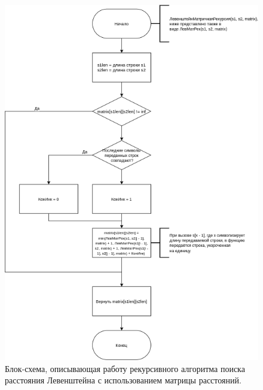 \documentclass[12pt]{report}
\begin{document}
\begin{figure}
\begin{center}
\includegraphics[scale=0.65]{inc/img/LevMatrRec.png}{}
\captionsetup{justification=centering}
	\caption{Блок-схема, описывающая работу рекурсивного алгоритма поиска расстояния Левенштейна с использованием матрицы расстояний.}
	\label{KC:2}
\end{center}
\end{figure}
\end{document}
